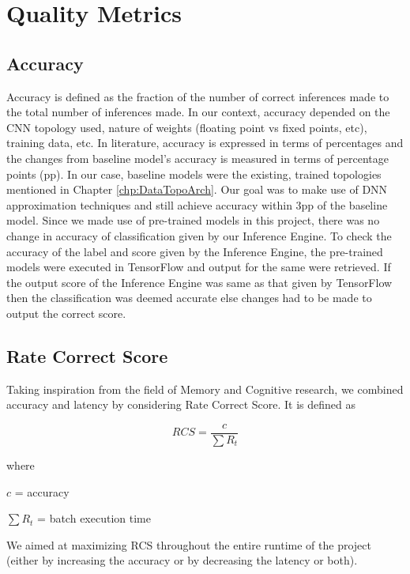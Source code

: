 \section{Quality Metrics}
\subsection{Accuracy}
Accuracy is defined as the fraction of the number of correct inferences made to the total number of inferences made. In our context, accuracy depended on the CNN topology used, nature of weights (floating point vs fixed points, etc), training data, etc. 
In literature, accuracy is expressed in terms of percentages and the changes from baseline model's accuracy is measured in terms of percentage points (pp). 
In our case, baseline models were the existing, trained topologies mentioned in Chapter \ref{chp:DataTopoArch}. Our goal was to make use of DNN approximation techniques and still achieve accuracy within 3pp of the baseline model.
\newline
Since we made use of pre-trained models in this project, there was no change in accuracy of classification given by our Inference Engine.
To check the accuracy of the label and score given by the Inference Engine, the pre-trained models were executed in TensorFlow and output for the same were retrieved. If the output score of the Inference Engine was same as that given by TensorFlow then the classification was deemed accurate else changes had to be made to output the correct score.

\subsection{Rate Correct Score}
Taking inspiration from the field of Memory and Cognitive research, we combined accuracy and latency by considering Rate Correct Score. It is defined as 

\begin{equation} \label{eqt:example_equation}
RCS = \frac{c}{\sum R_t}
\end{equation}


where   

$c$ = accuracy    

      $\sum R_t$ = batch execution time  
      
We aimed at maximizing RCS throughout the entire runtime of the project (either by increasing the accuracy or by decreasing the latency or both).
